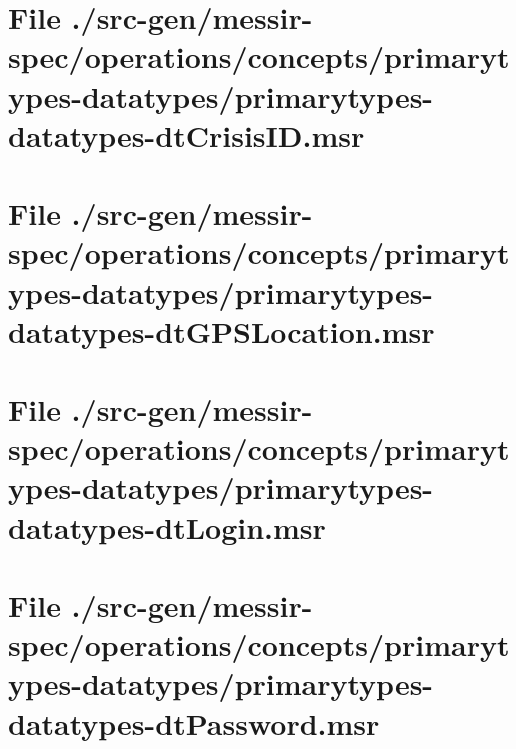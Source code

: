 \section[File /src-gen/messir-spec/operations.../primarytypes-datatypes-dtCrisisID.msr]{File ./src-gen/messir-spec/operations/concepts/primarytypes-datatypes/primarytypes-datatypes-dtCrisisID.msr}
\scriptsize

\normalsize
	
\section[File /src-gen/messir-spec.../primarytypes-datatypes-dtGPSLocation.msr]{File ./src-gen/messir-spec/operations/concepts/primarytypes-datatypes/primarytypes-datatypes-dtGPSLocation.msr}
\scriptsize

\normalsize
	
\section[File /src-gen/messir-spec/operations.../primarytypes-datatypes-dtLogin.msr]{File ./src-gen/messir-spec/operations/concepts/primarytypes-datatypes/primarytypes-datatypes-dtLogin.msr}
\scriptsize

\normalsize
	
\section[File /src-gen/messir-spec/operations.../primarytypes-datatypes-dtPassword.msr]{File ./src-gen/messir-spec/operations/concepts/primarytypes-datatypes/primarytypes-datatypes-dtPassword.msr}
\scriptsize

\normalsize
	
